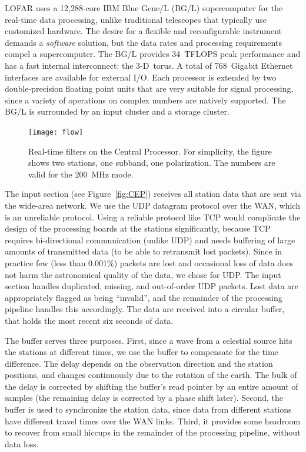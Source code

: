 \documentclass[journal]{IEEEtran}
\begin{document}
LOFAR uses a 12,288-core IBM Blue Gene/L (BG/L) supercomputer for the real-time
data processing,
unlike traditional telescopes that typically use customized hardware.
The desire for a flexible and reconfigurable instrument demands a
{\em software\/} solution, but the data rates and processing requirements
compel a supercomputer.
The BG/L provides 34~TFLOPS peak performance and has a fast internal
interconnect: the 3-D~torus.
A total of 768~Gigabit Ethernet interfaces are available for external I/O.
Each processor is extended by two double-precision floating point units
that are very suitable for signal processing, since a variety of operations
on complex numbers are natively supported.
The BG/L is surrounded by an input cluster and a storage cluster.


\begin{figure}
\texttt{[image: flow]}
\caption{Real-time filters on the Central Processor.  For simplicity, the
figure shows two stations, one subband, one polarization.  The numbers are
valid for the 200~MHz mode.}
\label{fig:flow}
\end{figure}

The input section (see Figure~\ref{fig:CEP}) receives all station data that
are sent via the wide-area network.
We use the UDP datagram protocol over the WAN, which is an unreliable
protocol.
Using a reliable protocol like TCP would complicate the design of the
processing boards at the stations significantly, because TCP requires
bi-directional communication (unlike UDP) and needs buffering of large amounts
of transmitted data (to be able to retransmit lost packets).
Since in practice few (less than 0.001\%) packets are lost and occasional loss
of data does not harm the astronomical quality of the data, we chose for UDP.
The input section handles duplicated, missing, and out-of-order UDP packets.
Lost data are appropriately flagged as being ``invalid'', and the remainder
of the processing pipeline handles this accordingly.
The data are received into a circular buffer, that holds the most recent
six seconds of data.

The buffer serves three purposes.
First, since a wave from a celestial source hits the stations at different
times, we use the buffer to compensate for the time difference.
The delay depends on the observation direction and the station positions,
and changes continuously due to the rotation of the earth.
The bulk of the delay is corrected by shifting the buffer's read pointer by
an entire amount of samples (the remaining delay is corrected by a phase
shift later).
Second, the buffer is used to synchronize the station data, since data from
different stations have different travel times over the WAN links.
Third, it provides some headroom to recover from small hiccups in the
remainder of the processing pipeline, without data loss.
\end{document}
